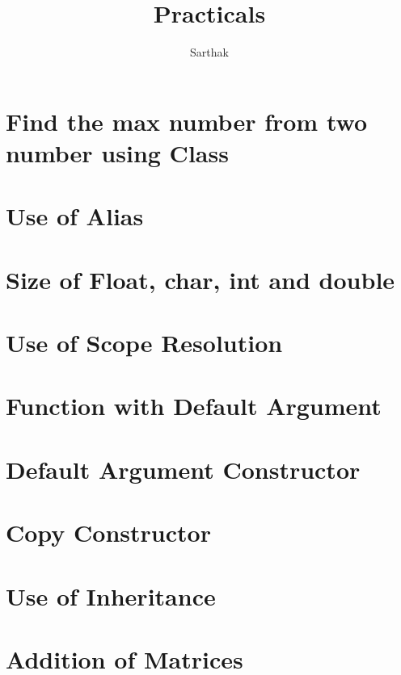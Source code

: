 \documentclass{article}
\title{Practicals}
\author{Sarthak}
\begin{document}
\maketitle
\tableofcontents
\newpage

\section{Find the max number from two number using Class}


\section{Use of Alias}
\section{Size of Float, char, int and double}
\section{Use of Scope Resolution}
\section{Function with Default Argument}
\section{Default Argument Constructor}
\section{Copy Constructor}
\section{Use of Inheritance}
\section{Addition of Matrices}
\end{document}
